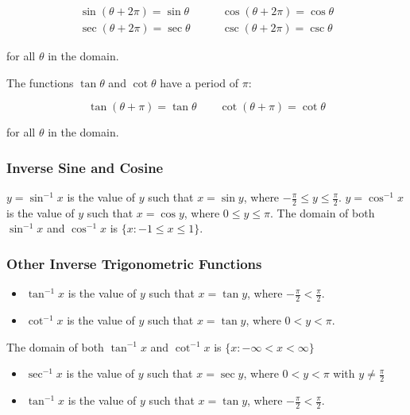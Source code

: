 \begin{align}
    \sin(\theta + 2\pi) = \sin\theta &\qquad \cos(\theta + 2\pi) = \cos\theta \\
    \sec(\theta + 2\pi) = \sec\theta &\qquad \csc(\theta + 2\pi) = \csc\theta
\end{align}

for all $\theta$ in the domain.

The functions $\tan\theta$ and $\cot \theta$ have a period of $\pi$:

\begin{equation}
    \tan(\theta + \pi) = \tan\theta \qquad \cot(\theta + \pi) = \cot\theta
\end{equation}

for all $\theta$ in the domain.

\subsubsection{Inverse Sine and Cosine}
$y = \sin^{-1} x$ is the value of $y$ such that $x = \sin y$, where $-\frac{\pi}{2} \leq y \leq \frac{\pi}{2}$. $y = \cos^{-1} x$ is the value of $y$ such that $x = \cos y$, where $0 \leq y \leq \pi$. The domain of both $\sin^{-1} x$ and $\cos^{-1} x$ is $\{ x: -1 \leq x \leq 1 \}$.

\subsubsection{Other Inverse Trigonometric Functions}
\begin{itemize}
    \item $\tan^{-1} x$ is the value of $y$ such that $x = \tan y$, where $-\frac{\pi}{2} < \frac{\pi}{2}$.
    \item $\cot^{-1} x$ is the value of $y$ such that $x = \tan y$, where $0 < y < \pi$.
\end{itemize}

The domain of both $\tan^{-1} x$ and $\cot^{-1} x$ is $\{ x: -\infty < x < \infty \}$

\begin{itemize}
    \item $\sec^{-1} x$ is the value of $y$ such that $x = \sec y$, where $0 < y < \pi$ with $y \neq \frac{\pi}{2}$
    \item $\tan^{-1} x$ is the value of $y$ such that $x = \tan y$, where $-\frac{\pi}{2} < \frac{\pi}{2}$.
\end{itemize}